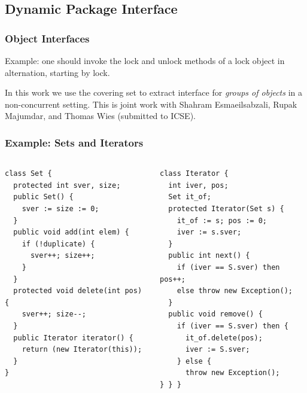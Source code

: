 \documentclass{beamer}
\begin{document}
\subsection{Dynamic Package Interface}

\begin{frame}
  \frametitle{Object Interfaces}
  Example: 
  one should invoke the lock and unlock methods of a lock object in alternation, starting by lock.
  \begin{center}
  \end{center}

  \vspace{2ex}

  In this work we use the covering set to extract interface for \emph{groups of objects} in a non-concurrent setting.
  This is joint work with Shahram Esmaeilsabzali, Rupak Majumdar, and Thomas Wies (submitted to ICSE).
\end{frame}

\begin{frame}[fragile]
  \frametitle{Example: Sets and Iterators}
  \begin{columns}
{\footnotesize
\begin{verbatim}
class Set {
  protected int sver, size;
  public Set() {
    sver := size := 0;
  }
  public void add(int elem) {
    if (!duplicate) {
      sver++; size++;
    }
  }
  protected void delete(int pos) {
    sver++; size--;
  }
  public Iterator iterator() {
    return (new Iterator(this));
  }
}
\end{verbatim}
}
{\footnotesize
\begin{verbatim}
class Iterator {
  int iver, pos;
  Set it_of;
  protected Iterator(Set s) {
    it_of := s; pos := 0;
    iver := s.sver;
  }
  public int next() {
    if (iver == S.sver) then pos++;
    else throw new Exception();
  }
  public void remove() {
    if (iver == S.sver) then {
      it_of.delete(pos);
      iver := S.sver;
    } else {
      throw new Exception();
} } }
\end{verbatim}
}
  \end{columns}

\end{frame}
\end{document}
